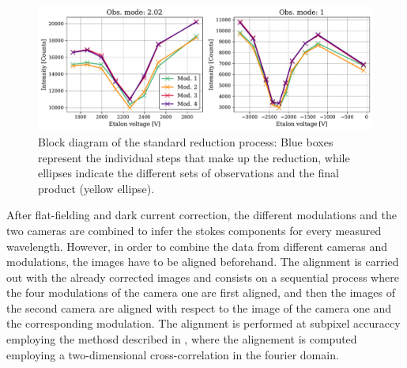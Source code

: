 \begin{figure}[t]
  \includegraphics[width=\textwidth]{figures/Pipeline/Spectral_scans_ecample.pdf}
  \caption{
    Block diagram of the standard reduction process: Blue boxes represent the individual steps that make up the reduction, while ellipses indicate the different sets of observations and the final product (yellow ellipse). }
    \label{fig_pipeline: spectral_scans}
\end{figure}

After flat-fielding and dark current correction, the different modulations and the two cameras are combined to infer the stokes components for every measured wavelength. However, in order to combine the data from different cameras and modulations, the images have to be aligned beforehand. The alignment is carried out with the already corrected images and consists on a sequential process where the four modulations of the camera one are first aligned, and then the images of the second camera are aligned with respect to the image of the camera one and the corresponding modulation. The alignment is performed at subpixel accuraccy employing the methosd described in \cite{alignment}, where the alignement is computed employing a two-dimensional cross-correlation in the fourier domain. 

